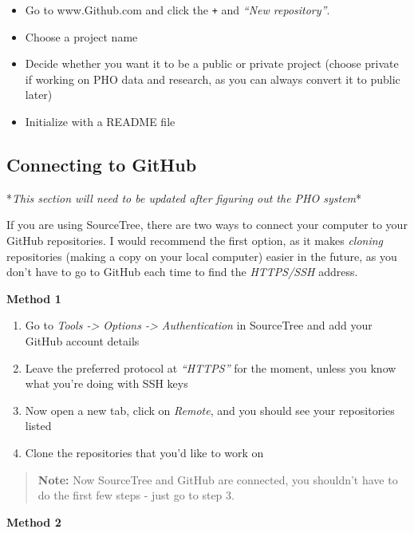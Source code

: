 \documentclass[]{book}
\providecommand{\tightlist}{%
  \setlength{\itemsep}{0pt}\setlength{\parskip}{0pt}}
\begin{document}
\begin{itemize}
\tightlist
\item
  Go to www.Github.com and click the \texttt{+} and \emph{``New repository''}.
\item
  Choose a project name
\item
  Decide whether you want it to be a public or private project (choose private if working on PHO data and research, as you can always convert it to public later)
\item
  Initialize with a README file
\end{itemize}

\hypertarget{connecting-to-github}{%
\subsection{Connecting to GitHub}\label{connecting-to-github}}

*\emph{This section will need to be updated after figuring out the PHO system}*

If you are using SourceTree, there are two ways to connect your computer to your GitHub repositories. I would recommend the first option, as it makes \emph{cloning} repositories (making a copy on your local computer) easier in the future, as you don't have to go to GitHub each time to find the \emph{HTTPS/SSH} address.

\textbf{Method 1}

\begin{enumerate}
\def\labelenumi{\arabic{enumi}.}
\tightlist
\item
  Go to \emph{Tools -\textgreater{} Options -\textgreater{} Authentication} in SourceTree and add your GitHub account details
\item
  Leave the preferred protocol at \emph{``HTTPS''} for the moment, unless you know what you're doing with SSH keys
\item
  Now open a new tab, click on \emph{Remote}, and you should see your repositories listed
\item
  Clone the repositories that you'd like to work on
\end{enumerate}

\begin{quote}
\textbf{Note:} Now SourceTree and GitHub are connected, you shouldn't have to do the first few steps - just go to step 3.
\end{quote}

\textbf{Method 2}
\end{document}
